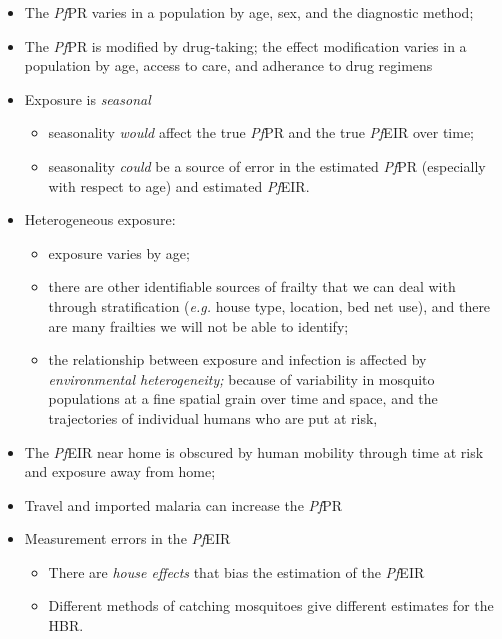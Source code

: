 \documentclass[
]{book}
\begin{document}
\begin{itemize}
\item
  The \emph{Pf}PR varies in a population by age, sex, and the diagnostic method;
\item
  The \emph{Pf}PR is modified by drug-taking; the effect modification varies in a population by age, access to care, and adherance to drug regimens
\item
  Exposure is \emph{seasonal}

  \begin{itemize}
  \item
    seasonality \emph{would} affect the true \emph{Pf}PR and the true \emph{Pf}EIR over time;
  \item
    seasonality \emph{could} be a source of error in the estimated \emph{Pf}PR (especially with respect to age) and estimated \emph{Pf}EIR.
  \end{itemize}
\item
  Heterogeneous exposure:

  \begin{itemize}
  \item
    exposure varies by age;
  \item
    there are other identifiable sources of frailty that we can deal with through stratification (\emph{e.g.} house type, location, bed net use), and there are many frailties we will not be able to identify;
  \item
    the relationship between exposure and infection is affected by \emph{environmental heterogeneity;} because of variability in mosquito populations at a fine spatial grain over time and space, and the trajectories of individual humans who are put at risk,
  \end{itemize}
\item
  The \emph{Pf}EIR near home is obscured by human mobility through time at risk and exposure away from home;
\item
  Travel and imported malaria can increase the \emph{Pf}PR
\item
  Measurement errors in the \emph{Pf}EIR

  \begin{itemize}
  \item
    There are \emph{house effects} that bias the estimation of the \emph{Pf}EIR
  \item
    Different methods of catching mosquitoes give different estimates for the HBR.
  \end{itemize}
\end{itemize}
\end{document}
